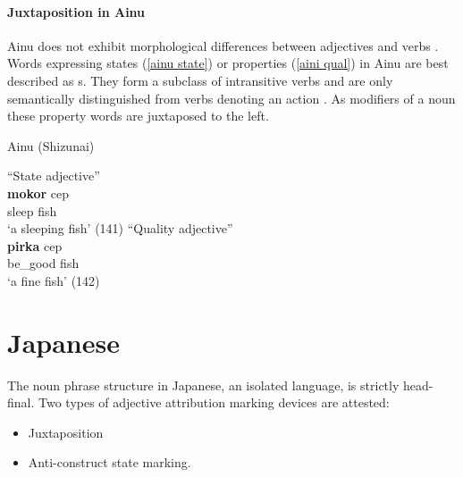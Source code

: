 \paragraph*{Juxtaposition in Ainu}
\label{ainu synchr}
Ainu does not exhibit morphological differences between adjectives and verbs \citep[27]{refsing1986}. Words expressing states (\ref{ainu state}) or properties (\ref{aini qual}) in Ainu are best described as s. They form a subclass of intransitive verbs and are only semantically distinguished from verbs denoting an action \cite[141–142]{refsing1986}. As modifiers of a noun these property words are juxtaposed to the left.
\begin{exe}
\ex \rm{Ainu (Shizunai) \citep{refsing1986}}
\begin{xlist}
\ex \rm{“State adjective”}\\ \label{ainu state}
\gll	\textbf{mokor} cep\\
	sleep fish\\
\glt	‘a sleeping fish’ (141)
\ex \rm{“Quality adjective”}\\ \label{aini qual}
\gll	\textbf{pirka} cep\\
	be\_good fish\\
\glt	‘a fine fish’ (142)
\end{xlist}
\end{exe}

\section{Japanese}
The noun phrase structure in Japanese, an isolated language, is strictly head-final. Two types of adjective attribution marking devices are attested:
\begin{itemize}
\item Juxtaposition
\item Anti\hyp{}construct state marking.
\end{itemize}
